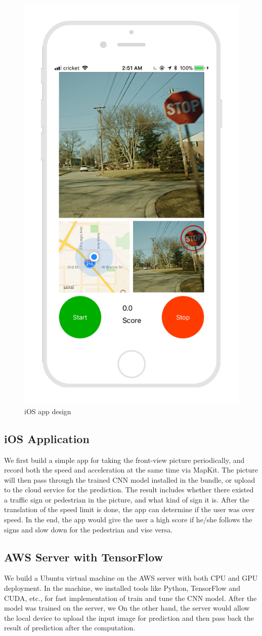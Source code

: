 \documentclass{article}
\begin{document}
\begin{figure}[ht]
\begin{minipage}{.4\textwidth}
    \includegraphics[width=.6\linewidth]{iOS_design.png}
    \caption{iOS app design}
    \label{fig:fig_2}
  \end{minipage}
\end{figure}
\subsection{iOS Application}
We first build a simple app for taking the front-view picture periodically, and record both the speed and acceleration at the same time via MapKit. The picture will then pass through the trained CNN model installed in the bundle, or upload to the cloud service for the prediction. The result includes whether there existed a traffic sign or pedestrian in the picture, and what kind of sign it is. After the translation of the speed limit is done, the app can determine if the user was over speed. In the end, the app would give the user a high score if he/she follows the signs and slow down for the pedestrian and vise versa.

\subsection{AWS Server with TensorFlow}
We build a Ubuntu virtual machine on the AWS server with both CPU and GPU deployment. In the machine, we installed tools like Python, TensorFlow and CUDA, etc., for fast implementation of train and tune the CNN model. After the model was trained on the server, we On the other hand, the server would allow the local device to upload the input image for prediction and then pass back the result of prediction after the computation.
\end{document}
